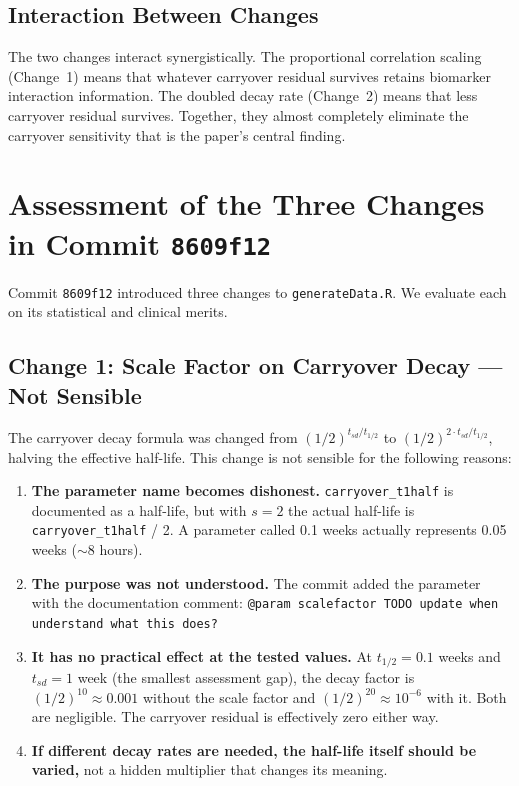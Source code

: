 \documentclass[11pt]{article}
\begin{document}
\subsection{Interaction Between Changes}

The two changes interact synergistically. The proportional
correlation scaling (Change~1) means that whatever carryover
residual survives retains biomarker interaction information.
The doubled decay rate (Change~2) means that less carryover
residual survives. Together, they almost completely eliminate
the carryover sensitivity that is the paper's central finding.

\section{Assessment of the Three Changes in Commit
         \texttt{8609f12}}

Commit \texttt{8609f12} introduced three changes to
\texttt{generateData.R}. We evaluate each on its statistical
and clinical merits.

\subsection{Change 1: Scale Factor on Carryover Decay ---
            Not Sensible}

The carryover decay formula was changed from
$(1/2)^{t_{sd}/t_{1/2}}$ to $(1/2)^{2 \cdot t_{sd}/t_{1/2}}$,
halving the effective half-life. This change is not sensible
for the following reasons:

\begin{enumerate}
\item \textbf{The parameter name becomes dishonest.}
  \texttt{carryover\_t1half} is documented as a half-life,
  but with $s = 2$ the actual half-life is
  \texttt{carryover\_t1half} / 2. A parameter called 0.1
  weeks actually represents 0.05 weeks ($\sim$8 hours).

\item \textbf{The purpose was not understood.} The commit
  added the parameter with the documentation comment:
  \texttt{@param scalefactor TODO update when understand
  what this does?}

\item \textbf{It has no practical effect at the tested
  values.} At $t_{1/2} = 0.1$ weeks and $t_{sd} = 1$ week
  (the smallest assessment gap), the decay factor is
  $(1/2)^{10} \approx 0.001$ without the scale factor and
  $(1/2)^{20} \approx 10^{-6}$ with it. Both are negligible.
  The carryover residual is effectively zero either way.

\item \textbf{If different decay rates are needed, the
  half-life itself should be varied,} not a hidden multiplier
  that changes its meaning.
\end{enumerate}
\end{document}
